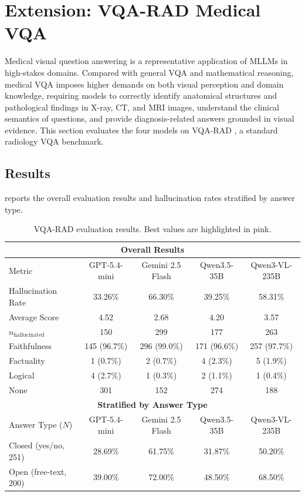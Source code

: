 \newpage
\section{Extension: VQA-RAD Medical VQA}
\label{sec:vqarad}

Medical visual question answering is a representative application
of MLLMs in high-stakes domains.
Compared with general VQA and mathematical reasoning,
medical VQA imposes higher demands on both visual perception
and domain knowledge,
requiring models to correctly identify anatomical structures
and pathological findings in X-ray, CT, and MRI images,
understand the clinical semantics of questions,
and provide diagnosis-related answers grounded in visual evidence.
This section evaluates the four models
on VQA-RAD \citep{lauDatasetClinicallyGenerated2018},
a standard radiology VQA benchmark.

\subsection{Results}

 reports the overall evaluation results
and hallucination rates stratified by answer type.

\begin{table}[htbp]
  \centering
  \caption{VQA-RAD evaluation results. Best values are highlighted in pink.}
  \label{tab:vqarad_results}
  \small
  \begin{tabular}{l cccc}
    \toprule
    \multicolumn{5}{c}{\textbf{Overall Results}} \\
    \midrule
    Metric
      & GPT-5.4-mini & Gemini 2.5 Flash & Qwen3.5-35B & Qwen3-VL-235B \\
    \midrule
    Hallucination Rate & \cellcolor{pink!25}33.26\% & 66.30\% & 39.25\% & 58.31\% \\
    Average Score      & \cellcolor{pink!25}4.52    & 2.68    & 4.20    & 3.57 \\
    $n_{\text{hallucinated}}$ & \cellcolor{pink!25}150 & 299 & 177 & 263 \\
    \quad Faithfulness & 145 (96.7\%) & 296 (99.0\%) & 171 (96.6\%) & 257 (97.7\%) \\
    \quad Factuality   & 1 (0.7\%)    & 2 (0.7\%)    & 4 (2.3\%)    & 5 (1.9\%) \\
    \quad Logical      & 4 (2.7\%)    & 1 (0.3\%)    & 2 (1.1\%)    & 1 (0.4\%) \\
    None               & 301 & 152 & 274 & 188 \\
    \midrule
    \multicolumn{5}{c}{\textbf{Stratified by Answer Type}} \\
    \midrule
    Answer Type ($N$)
      & GPT-5.4-mini & Gemini 2.5 Flash & Qwen3.5-35B & Qwen3-VL-235B \\
    \midrule
    Closed (yes/no, 251)   & \cellcolor{pink!25}28.69\% & 61.75\% & 31.87\% & 50.20\% \\
    Open (free-text, 200)  & \cellcolor{pink!25}39.00\% & 72.00\% & 48.50\% & 68.50\% \\
    \bottomrule
  \end{tabular}
\end{table}

